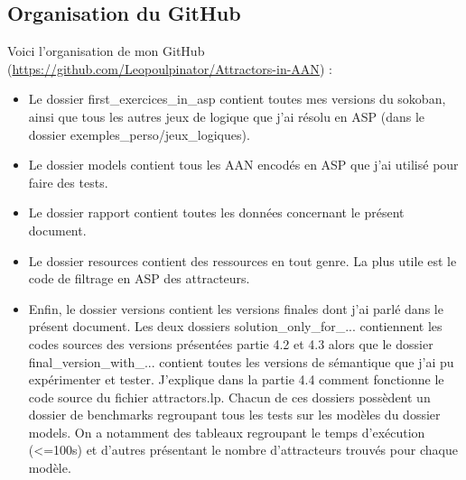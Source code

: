 \documentclass[10pt,a4paper]{article}
\begin{document}
\subsection{Organisation du GitHub}
Voici l'organisation de mon GitHub (\href{https://github.com/Leopoulpinator/Attractors-in-AAN}{https://github.com/Leopoulpinator/Attractors-in-AAN}) :\\
\begin{itemize}
	\item Le dossier first\_exercices\_in\_asp contient toutes mes versions du sokoban, ainsi que tous les autres jeux de logique que j'ai résolu en ASP (dans le dossier exemples\_perso/jeux\_logiques).
	\item Le dossier models contient tous les AAN encodés en ASP que j'ai utilisé pour faire des tests.
	\item Le dossier rapport contient toutes les données concernant le présent document.
	\item Le dossier resources contient des ressources en tout genre. La plus utile est le code de filtrage en ASP des attracteurs.
	\item Enfin, le dossier versions contient les versions finales dont j'ai parlé dans le présent document. Les deux dossiers solution\_only\_for\_... contiennent les codes sources des versions présentées partie 4.2 et 4.3 
	alors que le dossier final\_version\_with\_... contient toutes les versions de sémantique que j'ai pu expérimenter et tester. J'explique dans la partie 4.4 comment fonctionne le code source du fichier attractors.lp. 
	Chacun de ces dossiers possèdent un dossier de benchmarks regroupant tous les tests sur les modèles du dossier models. On a notamment des tableaux regroupant le temps d'exécution (\textless=100s) et d'autres présentant le 
	nombre d'attracteurs trouvés pour chaque modèle.
\end{itemize}
\end{document}
